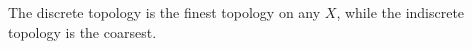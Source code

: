 \begin{example}
	The discrete topology is the finest topology on any $X$, while the indiscrete topology is the coarsest.
\end{example}



























%